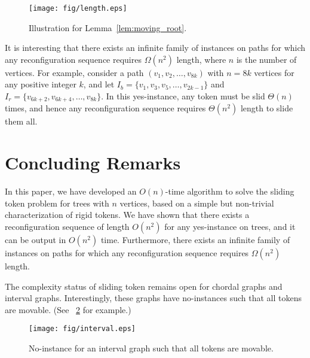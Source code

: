 \documentclass{llncs}
\newcommand{\bfI}{I}
\begin{document}
\begin{figure}[t]
\begin{center}
	\texttt{[image: fig/length.eps]}
	\end{center}
	\vspace{-1em}
	\caption{Illustration for Lemma~\ref{lem:moving_root}.}
	\label{fig:length}
\end{figure}


It is interesting that there exists an infinite family of instances on paths
for which any reconfiguration sequence requires $\Omega(n^2)$ length,
where $n$ is the number of vertices. 
For example, consider a path $(v_1,v_2,\ldots,v_{8k})$ with $n=8k$ vertices for any positive integer $k$, and
let $\bfI_b=\{v_1,v_3,v_5,\ldots,v_{2k-1}\}$ and $\bfI_r=\{v_{6k+2},v_{6k+4},\ldots,v_{8k}\}$.
In this yes-instance, any token must be slid $\Theta(n)$ times, 
and hence any reconfiguration sequence requires $\Theta(n^2)$ length to slide them all.




\section{Concluding Remarks}

	In this paper, we have developed an $O(n)$-time algorithm to solve the {\sc sliding token} problem for trees with $n$ vertices, based on a simple but non-trivial characterization of rigid tokens. 
	We have shown that there exists a reconfiguration sequence of length $O(n^2)$ for any yes-instance on trees, and it can be output in $O(n^2)$ time. 
	Furthermore, there exists an infinite family of instances on paths for which any reconfiguration sequence requires $\Omega(n^2)$ length.

	The complexity status of {\sc sliding token} remains open for chordal graphs and interval graphs.
	Interestingly, these graphs have no-instances such that all tokens are movable. 
(See \figurename~\ref{fig:interval} for example.) 

\begin{figure}[t]
\begin{center}
	\texttt{[image: fig/interval.eps]}
	\end{center}
	\vspace{-1em}
	\caption{No-instance for an interval graph such that all tokens are movable.}
	\label{fig:interval}
\end{figure}
\end{document}
